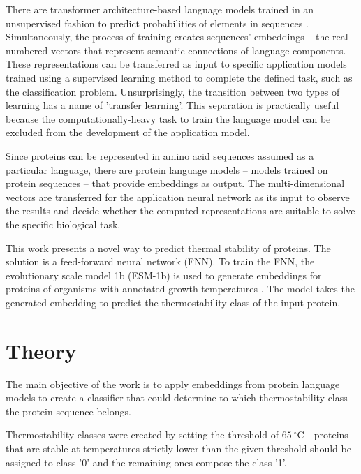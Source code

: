 \documentclass[12pt]{article}
\begin{document}
	There are transformer architecture-based language models trained in an 
	unsupervised fashion to predict probabilities of elements in sequences 
	\cite{devlin2018bert}. 
	Simultaneously, the process of training creates sequences' embeddings – the 
	real numbered vectors that represent semantic connections of language 
	components. These representations can be transferred as input to specific 
	application models trained using a supervised learning method to complete 
	the defined task, such as the classification problem. Unsurprisingly, the 
	transition between two types of learning has a name of 'transfer learning'. 
	This separation is practically useful because the computationally-heavy 
	task to train the language model can be excluded from the development of 
	the application model.

	Since proteins can be represented in amino acid sequences assumed as a 
	particular language, there are protein language models – models trained on 
	protein sequences – that provide embeddings as output. The multi-dimensional 
	vectors are transferred for the application neural network as its input to 
	observe the results and decide whether the computed representations are 
	suitable to solve the specific biological task.

	This work presents a novel way to predict thermal stability of proteins. 
	The solution is a feed-forward neural network (FNN). To train the FNN, 
	the evolutionary scale model 1b (ESM-1b)\cite{rives2021biological} is used to 
	generate embeddings for proteins of organisms with annotated growth 
	temperatures \cite{engqvist_martin_karl_magnus_2018_1175609}. The model 
	takes the generated embedding to predict the thermostability class of the 
	input protein.

	\newpage

	\section{Theory}

	The main objective of the work is to apply embeddings from protein language 
	models to create a classifier that could determine to which thermostability 
	class the protein sequence belongs.

	Thermostability classes were created by setting the threshold of 
	$65\ ^\circ$C - proteins that are stable at temperatures strictly lower 
	than the given threshold should be assigned to class '0' and the 
	remaining ones compose the class '1'. 
\end{document}
